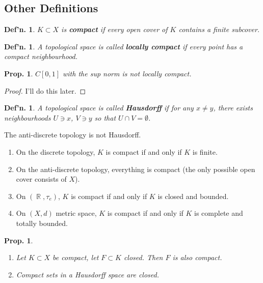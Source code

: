 \documentclass[12pt, a4paper]{book}
\DeclareMathOperator{\R}{\mathbb{R}}
\newtheorem{definition}[theorem]{Def'n.}
\newtheorem{proposition}[theorem]{Prop.}
\theoremstyle{nonumberplain}
\newtheorem{proof}{Proof}
\begin{document}
\subsection{Other Definitions}
\begin{definition}
    $K\subset X$ is \textbf{compact} if every open cover of $K$ contains a finite subcover.
\end{definition}
\begin{definition}
    A topological space is called \textbf{locally compact} if every point has a compact neighbourhood.
\end{definition}
\begin{proposition}
    $C[0,1]$ with the sup norm is not locally compact.
\end{proposition}
\begin{proof}
    I'll do this later.
\end{proof}
\begin{definition}
    A topological space is called \textbf{Hausdorff} if for any $x\neq y$, there exists neighbourhoods $U\ni x$, $V\ni y$ so that $U\cap V=\emptyset$.
\end{definition}
The anti-discrete topology is not Hausdorff.
\begin{enumerate}[nolistsep]
    \item On the discrete topology, $K$ is compact if and only if $K$ is finite.
    \item On the anti-discrete topology, everything is compact (the only possible open cover consists of $X$).
    \item On $(\R,\tau_e)$, $K$ is compact if and only if $K$ is closed and bounded.
    \item On $(X,d)$ metric space, $K$ is compact if and only if $K$ is complete and totally bounded.
\end{enumerate}
\begin{proposition}
    \begin{enumerate}[nolistsep]
        \item Let $K\subset X$ be compact, let $F\subset K$ closed.
            Then $F$ is also compact.
        \item Compact sets in a Hausdorff space are closed.
    \end{enumerate}
\end{proposition}
\end{document}
